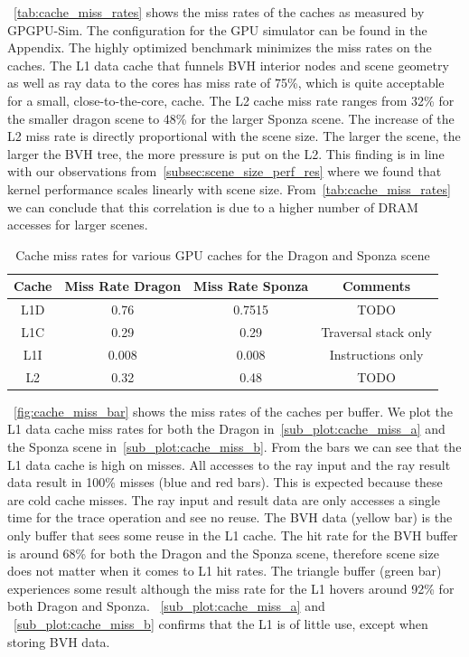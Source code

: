 ~\autoref{tab:cache_miss_rates} shows the miss rates of the caches as measured by GPGPU-Sim. The configuration for the GPU simulator can be found in the Appendix. 
The highly optimized benchmark minimizes the miss rates on the caches. The L1 data cache that funnels BVH interior nodes and scene geometry as well as ray data to the cores has miss rate of 75\%, which is quite acceptable for a small, close-to-the-core, cache.
The L2 cache miss rate ranges from 32\% for the smaller dragon scene to 48\% for the larger Sponza scene. The increase of the L2 miss rate is directly proportional with the scene size. The larger the scene, the larger the BVH tree, the more pressure is put on the L2. This finding is in line with our observations from~\autoref{subsec:scene_size_perf_res} where we found that kernel performance scales linearly with scene size. From~\autoref{tab:cache_miss_rates} we can conclude that this correlation is due to a higher number of DRAM accesses for larger scenes. 

\begin{table}[t]
\centering
\begin{tabular}{ |c||c|c|c|  }
 \hline
 Cache & Miss Rate Dragon & Miss Rate Sponza & Comments \\
 \hline
 L1D     & 0.76   & 0.7515  & TODO \\
 L1C     & 0.29    & 0.29   & Traversal stack only \\
 L1I     & 0.008    & 0.008   & Instructions only \\ 
 \hline
 L2 & 0.32 & 0.48  & TODO \\
 \hline
\end{tabular}
\caption{\label{tab:cache_miss_rates}Cache miss rates for various GPU caches for the Dragon and Sponza scene}
\end{table}

~\autoref{fig:cache_miss_bar} shows the miss rates of the caches per buffer.
We plot the L1 data cache miss rates for both the Dragon in~\autoref{sub_plot:cache_miss_a} and the Sponza scene in~\autoref{sub_plot:cache_miss_b}. From the bars we can see that the L1 data cache is high on misses. All accesses to the ray input and the ray result data result in 100\% misses (blue and red bars). This is expected because these are cold cache misses. The ray input and result data are only accesses a single time for the trace operation and see no reuse. The BVH data (yellow bar) is the only buffer that sees some reuse in the L1 cache. The hit rate for the BVH buffer is around 68\% for both the Dragon and the Sponza scene, therefore scene size does not matter when it comes to L1 hit rates. The triangle buffer (green bar) experiences some result although the miss rate for the L1 hovers around 92\% for both Dragon and Sponza. 
~\autoref{sub_plot:cache_miss_a} and ~\autoref{sub_plot:cache_miss_b} confirms that the L1 is of little use, except when storing BVH data. 

